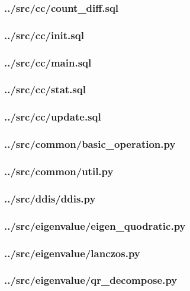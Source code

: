 \subsubsection{../src/cc/count\_diff.sql}

\subsubsection{../src/cc/init.sql}

\subsubsection{../src/cc/main.sql}

\subsubsection{../src/cc/stat.sql}

\subsubsection{../src/cc/update.sql}

\subsubsection{../src/common/basic\_operation.py}

\subsubsection{../src/common/util.py}

\subsubsection{../src/ddis/ddis.py}

\subsubsection{../src/eigenvalue/eigen\_quodratic.py}

\subsubsection{../src/eigenvalue/lanczos.py}

\subsubsection{../src/eigenvalue/qr\_decompose.py}


